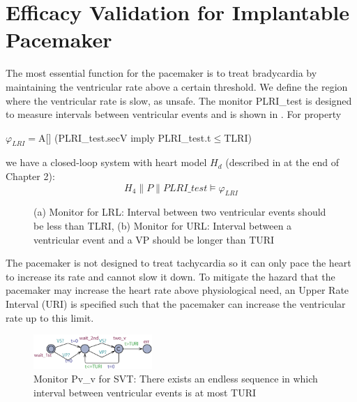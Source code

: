 \section{Efficacy Validation for Implantable Pacemaker}
The most essential function for the pacemaker is to treat bradycardia by maintaining the ventricular rate above a certain threshold. We define the region where the ventricular rate is slow, as \textsf{unsafe}. The monitor \textsf{PLRI\_test} is designed to measure intervals between ventricular events and is shown in . For property
\begin{center}
\textsf{$\varphi_{LRI}=$A[] (PLRI\_test.secV imply PLRI\_test.t$\leq$TLRI)}
\end{center}
we have a closed-loop system  with heart model $H_d$ (described in at the end of Chapter 2): 
$$H_4\| P\| PLRI\_test\models\varphi_{LRI}$$

\begin{figure}[t]
\centering
	\caption{(a) Monitor for LRL: Interval between two ventricular events should be less than TLRI, (b) Monitor for URL: Interval between a ventricular event and a VP should be longer than TURI}
\vspace{-10pt}
\end{figure} 

The pacemaker is not designed to treat tachycardia so it can only pace the heart to increase its rate and cannot slow it down. To mitigate the hazard that the pacemaker may increase the heart rate above physiological need, an Upper Rate Interval (URI) is specified such that the pacemaker can increase the ventricular rate up to this limit. 

\begin{figure}[b]
		\centering
		\includegraphics[width=0.4\textwidth]{figs/vv.pdf}
		\caption{\small Monitor \textsf{Pv\_v} for SVT: There exists an endless sequence in which interval between ventricular events is at most TURI}
		\label{fig:vv}
\end{figure}
  
